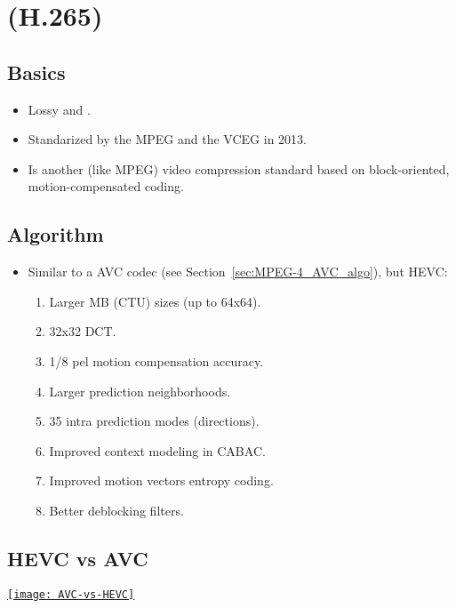 \chapter{ (H.265)}
\label{cha:HEVC}

\section{Basics}
\begin{itemize}
\item Lossy and  \cite{wikipedia_HEVC}.
\item Standarized by the \gls{MPEG} and the \gls{VCEG} in 2013.
\item Is another (like \gls{MPEG}) video compression standard based on
  block-oriented, motion-compensated coding.
\end{itemize}

\section{Algorithm}
\label{sec:HEVC_algo}
\begin{itemize}
\item Similar to a \gls{AVC} codec (see Section~\ref{sec:MPEG-4_AVC_algo}),
  but \gls{HEVC}:
\begin{enumerate}
\item Larger MB (\gls{CTU}) sizes (up to 64x64).
\item 32x32 \gls{DCT}.
\item 1/8 pel motion compensation accuracy.
\item Larger prediction neighborhoods.
\item 35 intra prediction modes (directions).
\item Improved context modeling in \gls{CABAC}.
\item Improved motion vectors entropy coding.
\item Better deblocking filters.
\end{enumerate}
\end{itemize}

\section{HEVC vs AVC}
\begin{center}
  \href{https://www.epiphan.com/blog/h264-vs-h265/}{\texttt{[image: AVC-vs-HEVC]}}
\end{center}
